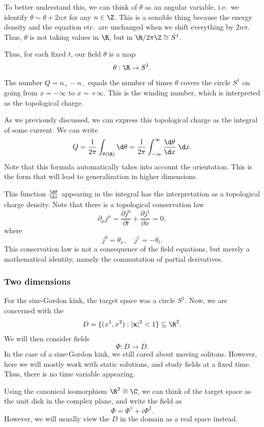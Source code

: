 \documentclass[a4paper]{article}
\begin{document}
To better understand this, we can think of $\theta$ as an angular variable, i.e.\ we identify $\theta \sim \theta + 2n\pi$ for any $n \in \Z$. This is a sensible thing because the energy density and the equation etc.\ are unchanged when we shift everything by $2n\pi$. Thus, $\theta$ is not taking values in $\R$, but in $\R/2\pi\Z \cong S^1$.

Thus, for each fixed $t$, our field $\theta$ is a map
\[
  \theta: \R \to S^1.
\]
The number $Q = n_+ - n_-$ equals the number of times $\theta$ covers the circle $S^1$ on going from $x = -\infty$ to $x = +\infty$. This is the winding number, which is interpreted as the topological charge.

As we previously discussed, we can express this topological charge as the integral of some current. We can write
\[
  Q = \frac{1}{2\pi} \int_{\theta(\R)} \d \theta = \frac{1}{2\pi} \int_{-\infty}^\infty \frac{\d \theta}{\d x}\;\d x.
\]
Note that this formula automatically takes into account the orientation. This is the form that will lead to generalization in higher dimensions.

This function $\frac{\d \theta}{\d x}$ appearing in the integral has the interpretation as a topological charge density. Note that there is a topological conservation law
\[
  \partial_\mu j^\mu = \frac{\partial j^0}{\partial t} + \frac{\partial j^1}{\partial x} = 0,
\]
where
\[
  j^0 = \theta_x,\quad j^1 = -\theta_t.
\]
This conservation law is not a consequence of the field equations, but merely a mathematical identity, namely the commutation of partial derivatives.

\subsubsection*{Two dimensions}
For the sine-Gordon kink, the target space was a circle $S^1$. Now, we are concerned with the 
\[
  D = \{(x^1, x^2): |\mathbf{x}|^2 < 1\} \subseteq \R^2.
\]
We will then consider fields
\[
  \Phi: D \to D.
\]
In the case of a sine-Gordon kink, we still cared about moving solitons. However, here we will mostly work with static solutions, and study fields at a fixed time. Thus, there is no time variable appearing.

Using the canonical isomorphism $\R^2 \cong \C$, we can think of the target space as the unit disk in the complex plane, and write the field as
\[
  \Phi = \Phi^1 + i \Phi^2.
\]
However, we will usually view the $D$ in the domain as a real space instead.
\end{document}
